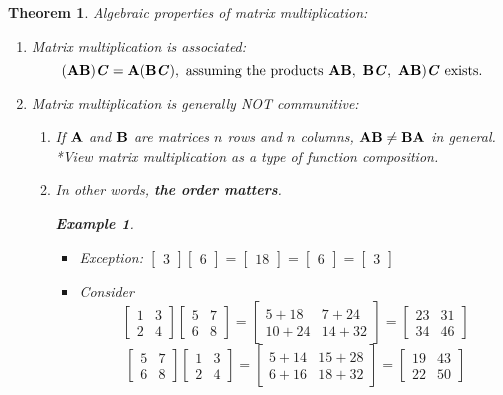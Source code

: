\documentclass[12pt, a4paper]{article}
\newtheorem{thm}{Theorem}[subsection]
\newtheorem{eg}{Example}[subsection]
\def\matrixA{\vb{A}}
\def\matrixB{\vb{B}}
\begin{document}
\begin{thm}
Algebraic properties of matrix multiplication: 
\begin{enumerate}
	\item Matrix multiplication is associated: 
	\[(\matrixA\matrixB)\textbf{\emph{C}}=\matrixA(\matrixB\textbf{\emph{C}}),\text{ assuming the products }\matrixA\matrixB,\ \matrixB\textbf{\emph{C}},\ \matrixA\matrixB)\textbf{\emph{C}}\text{ exists.}\]
	\item Matrix multiplication is generally NOT communitive: 
	\begin{enumerate}
		\item If $\matrixA$ and $\matrixB$ are matrices $n$ rows and $n$ columns, $\matrixA\matrixB\neq\matrixB\matrixA$ in general. 
		*View matrix multiplication as a type of function composition. 
		\item In other words, \textbf{the order matters}.
		\begin{eg}
		\begin{itemize}
			\item Exception: $\begin{bmatrix}3\end{bmatrix}\begin{bmatrix}6\end{bmatrix}=\begin{bmatrix}18\end{bmatrix}=\begin{bmatrix}6\end{bmatrix}=\begin{bmatrix}3\end{bmatrix}$	
			\item Consider
			\[\begin{bmatrix}1&3\\2&4\end{bmatrix}\begin{bmatrix}5&7\\6&8\end{bmatrix}=\begin{bmatrix}5+18&7+24\\10+24&14+32\end{bmatrix}=\begin{bmatrix}23&31\\34&46\end{bmatrix}\]
			\[\begin{bmatrix}5&7\\6&8\end{bmatrix}\begin{bmatrix}1&3\\2&4\end{bmatrix}=\begin{bmatrix}5+14&15+28\\6+16&18+32\end{bmatrix}=\begin{bmatrix}19&43\\22&50\end{bmatrix}\]

\end{itemize}
\end{eg}
\end{enumerate}
\end{enumerate}
\end{thm}
\end{document}
